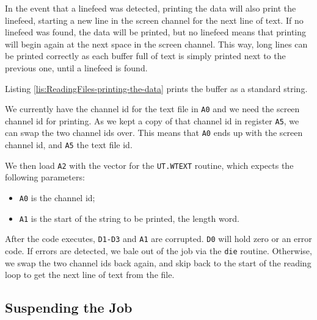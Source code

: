 In the event that a linefeed was detected, printing the data will
also print the linefeed, starting a new line in the screen channel
for the next line of text. If no linefeed was found, the data will
be printed, but no linefeed means that printing will begin again at
the next space in the screen channel. This way, long lines can be
printed correctly as each buffer full of text is simply printed next
to the previous one, until a linefeed is found.

Listing \ref{lis:ReadingFiles-printing-the-data} prints the buffer
as a standard string.



We currently have the channel id for the text file in \texttt{A0}
and we need the screen channel id for printing. As we kept a copy
of that channel id in register \texttt{A5}, we can swap the two channel
ids over. This means that \texttt{A0} ends up with the screen channel
id, and \texttt{A5} the text file id.

We then load \texttt{A2} with the vector for the \texttt{UT.WTEXT}
routine, which expects the following parameters:
\begin{itemize}
\item \texttt{A0} is the channel id;
\item \texttt{A1} is the start of the string to be printed, the length word.
\end{itemize}
After the code executes, \texttt{D1-D3} and \texttt{A1} are corrupted.
\texttt{D0} will hold zero or an error code. If errors are detected,
we bale out of the job via the \texttt{die} routine. Otherwise, we
swap the two channel ids back again, and skip back to the start of
the reading loop to get the next line of text from the file.

\subsection{Suspending the Job}

